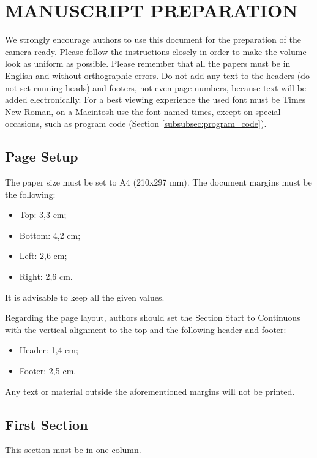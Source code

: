 \documentclass[a4paper,twoside]{article}
\begin{document}
\section{\uppercase{Manuscript Preparation}}

\noindent We strongly encourage authors to use this document for the preparation of the camera-ready. Please follow the instructions closely in order to make the volume look as uniform as possible.
Please remember that all the papers must be in English and without orthographic errors.
Do not add any text to the headers (do not set running heads) and footers, not even page numbers, because text will be added electronically.
For a best viewing experience the used font must be Times New Roman, on a Macintosh use the font named times, except on special occasions, such as program code (Section \ref{subsubsec:program_code}).

\subsection{Page Setup}

The paper size must be set to A4 (210x297 mm). The document
margins must be the following:

\begin{itemize}
    \item Top: 3,3 cm;
    \item Bottom: 4,2 cm;
    \item Left: 2,6 cm;
    \item Right: 2,6 cm.
\end{itemize}

It is advisable to keep all the given values.


Regarding the page layout, authors should set the Section Start to Continuous with the vertical alignment to the top and the following header and footer:

\begin{itemize}
    \item Header: 1,4 cm;
    \item Footer: 2,5 cm.
\end{itemize}

Any text or material outside the aforementioned margins will not be printed.

\subsection{First Section}

This section must be in one column.
\end{document}
